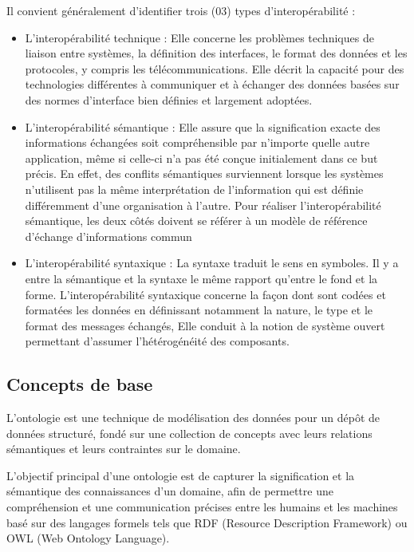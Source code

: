 \documentclass{article}
\begin{document}
	Il convient généralement d’identifier trois (03) types d’interopérabilité :
	\begin{itemize}
		\item L’interopérabilité technique : Elle concerne les problèmes techniques de liaison entre systèmes, la
		définition des interfaces, le format des données et les protocoles, y compris les
		télécommunications. Elle décrit la capacité pour des technologies différentes à
		communiquer et à échanger des données basées sur des normes d'interface bien
		définies et largement adoptées.
		
		\item L’interopérabilité sémantique :
		Elle assure que la signification exacte des informations échangées soit
		compréhensible par n’importe quelle autre application, même si celle-ci n’a pas été
		conçue initialement dans ce but précis. En effet, des conflits sémantiques surviennent
		lorsque les systèmes n’utilisent pas la même interprétation de l’information qui est
		définie différemment d’une organisation à l’autre. Pour réaliser l'interopérabilité
		sémantique, les deux côtés doivent se référer à un modèle de référence d'échange
		d'informations commun
		
		\item L’interopérabilité syntaxique :
		La syntaxe traduit le sens en symboles. Il y a entre la sémantique et la syntaxe
		le même rapport qu'entre le fond et la forme. L’interopérabilité syntaxique concerne
		la façon dont sont codées et formatées les données en définissant notamment la
		nature, le type et le format des messages échangés, Elle conduit à la notion de
		système ouvert permettant d'assumer l'hétérogénéité des composants.
	\end{itemize}

	\subsection{Concepts de base}
	L'ontologie est une technique de modélisation des données pour un dépôt de données structuré,
	fondé sur une collection de concepts avec leurs relations sémantiques et leurs contraintes sur le
	domaine.
	
		L'objectif principal d'une ontologie est de capturer la signification et la sémantique des
	connaissances d'un domaine, afin de permettre une compréhension et une communication
	précises entre les humains et les machines basé sur des langages formels tels que RDF
	(Resource Description Framework) ou OWL (Web Ontology Language).
	
\end{document}
